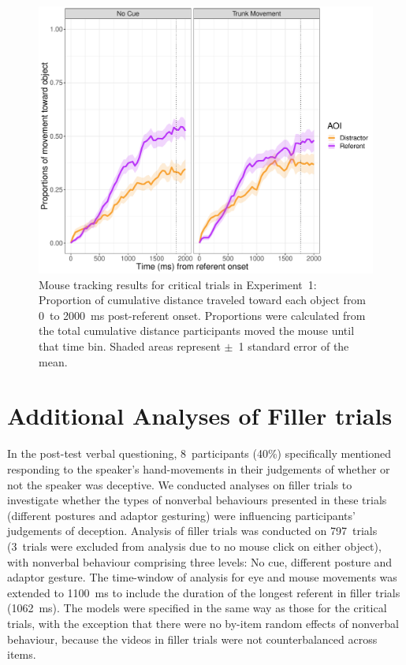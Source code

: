 \documentclass[a4paper,man,natbib]{apa6}
\begin{document}
\begin{figure}[Ht]
  \centering
	\includegraphics[width=\linewidth]{./img/e7_mouse_crit.pdf}
  \caption{Mouse tracking results for critical trials in Experiment~1: Proportion of cumulative distance traveled toward each object from 0~to 2000~ms post-referent onset. Proportions were calculated from the total cumulative distance participants moved the mouse until that time bin. Shaded areas represent $\pm$~1 standard error of the mean.}
  \label{fig:v1_mouse1}
\end{figure}

\section{Additional Analyses of Filler trials}
In the post-test verbal questioning, 8~participants (40\%) specifically mentioned responding to the speaker's hand-movements in their judgements of whether or not the speaker was deceptive. 
We conducted analyses on filler trials to investigate whether the types of nonverbal behaviours presented in these trials (different postures and adaptor gesturing) were influencing participants' judgements of deception.
Analysis of filler trials was conducted on 797~trials (3~trials were excluded from analysis due to no mouse click on either object), with nonverbal behaviour comprising three levels: No cue, different posture and adaptor gesture. %
The time-window of analysis for eye  and mouse  movements was extended to 1100~ms to include the duration of the longest referent in filler trials (1062~ms).
The models were specified in the same way as those for the critical trials, with the exception that there were no by-item random effects of nonverbal behaviour, because the videos in filler trials were not counterbalanced across items.
\end{document}
